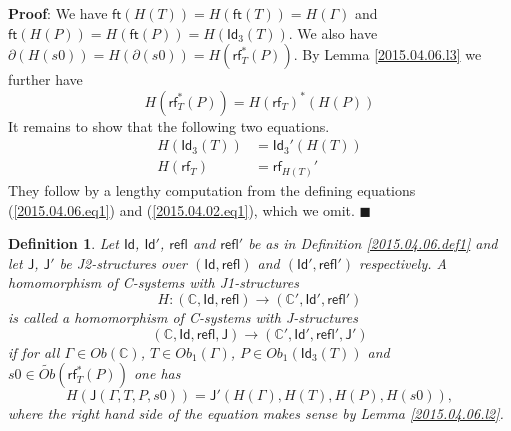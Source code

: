 \documentclass[12pt]{article}
\numberwithin{equation}{section}
\newenvironment{myproof}{{\bf Proof}:}{$\blacksquare$ \vskip 5mm }
\newtheorem{definition}[proposition]{Definition}
\newcommand{\sr}{\rightarrow}
\newcommand{\wt}{\widetilde}
\newcommand{\CC}{{\mathbb C}}  %
\newcommand{\ft}{\mathsf{ft}}
\newcommand{\Id}{\mathsf{Id}} %
\newcommand{\Idx}{\mathsf{Id}_3} %
\newcommand{\refl}{\mathsf{refl}}
\newcommand{\J}{\mathsf{J}}
\newcommand{\rf}{\mathsf{rf}}
\newcommand{\Obwt}{\wt{Ob}}
\begin{document}
%
\begin{myproof}
We have $\ft(H(T))=H(\ft(T))=H(\Gamma)$ and $\ft(H(P))=H(\ft(P))=H(\Idx(T))$. We
also have $\partial(H(s0))=H(\partial(s0))=H(\rf_T^*(P))$. By Lemma
\ref{2015.04.06.l3} we further have
%
$$H(\rf_T^*(P))=H(\rf_T)^*(H(P))$$
%
It remains to show that the following two equations.
\begin{align}
  H(\Idx(T)) & = \Idx'(H(T))   \label{HIdxT-eqn} \\
  H(\rf_T)   & = \rf_{H(T)}'   \label{HrfT-eqn}
\end{align}
They follow by a lengthy computation from the defining
equations (\ref{2015.04.06.eq1}) and (\ref{2015.04.02.eq1}), which we omit.
\end{myproof}
%
\begin{definition}
\label{2015.04.06.def2} Let $\Id$, $\Id'$, $\refl$ and $\refl'$ be as in
Definition \ref{2015.04.06.def1} and let $\J$, $\J'$ be J2-structures over
$(\Id,\refl)$ and $(\Id',\refl')$ respectively. A homomorphism of C-systems with
J1-structures
%
$$H:(\CC,\Id,\refl)\sr (\CC',\Id',\refl')$$
%
is called a homomorphism of C-systems with J-structures
%
$$(\CC,\Id,\refl,\J)\sr (\CC',\Id',\refl',\J')$$
%
if for all $\Gamma\in Ob(\CC)$, $T\in Ob_1(\Gamma)$, $P\in Ob_1(\Idx(T))$ and
$s0\in \Obwt(\rf_T^*(P))$ one has
%
$$H(\J(\Gamma,T,P,s0))=\J'(H(\Gamma),H(T),H(P),H(s0)),$$
%
where the right hand side of the equation makes sense by Lemma
\ref{2015.04.06.l2}.
\end{definition}
%
\end{document}
